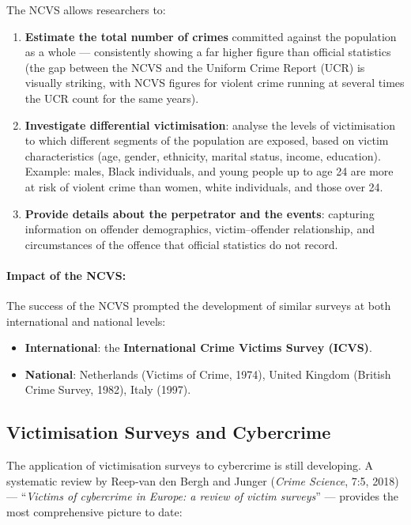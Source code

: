 \documentclass[11pt,a4paper,openany]{report}
\theoremstyle{definition}
\theoremstyle{plain}
\theoremstyle{remark}
\begin{document}
The NCVS allows researchers to:
\begin{enumerate}
    \item \textbf{Estimate the total number of crimes} committed against the population as a whole --- consistently showing a far higher figure than official statistics (the gap between the NCVS and the Uniform Crime Report (UCR) is visually striking, with NCVS figures for violent crime running at several times the UCR count for the same years).
    \item \textbf{Investigate differential victimisation}: analyse the levels of victimisation to which different segments of the population are exposed, based on victim characteristics (age, gender, ethnicity, marital status, income, education). Example: males, Black individuals, and young people up to age 24 are more at risk of violent crime than women, white individuals, and those over 24.
    \item \textbf{Provide details about the perpetrator and the events}: capturing information on offender demographics, victim--offender relationship, and circumstances of the offence that official statistics do not record.
\end{enumerate}

\paragraph{Impact of the NCVS:}
The success of the NCVS prompted the development of similar surveys at both international and national levels:
\begin{itemize}
    \item \textbf{International}: the \textbf{International Crime Victims Survey (ICVS)}.
    \item \textbf{National}: Netherlands (Victims of Crime, 1974), United Kingdom (British Crime Survey, 1982), Italy (1997).
\end{itemize}

\subsection{Victimisation Surveys and Cybercrime}

The application of victimisation surveys to cybercrime is still developing. A systematic review by Reep-van den Bergh and Junger (\textit{Crime Science}, 7:5, 2018) --- ``\textit{Victims of cybercrime in Europe: a review of victim surveys}'' --- provides the most comprehensive picture to date:
\end{document}
